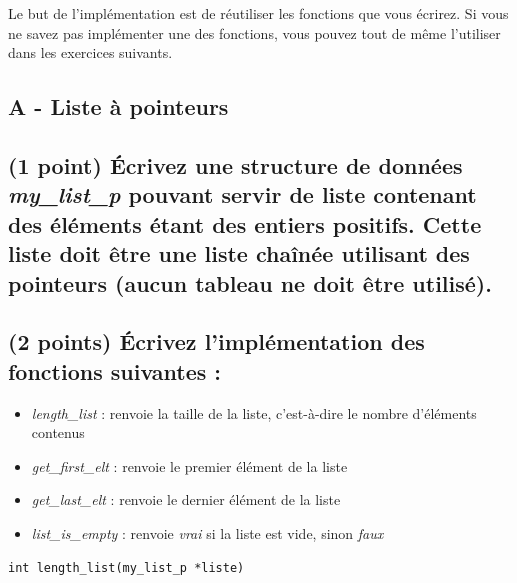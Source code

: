 \documentclass[11pt,a4paper]{article}
\begin{document}
Le but de l'implémentation est de réutiliser les fonctions que vous écrirez.
Si vous ne savez pas implémenter une des fonctions, vous pouvez tout de même l'utiliser dans les exercices suivants.

\vfillFirst

\subsection*{A - Liste à pointeurs}

\subsection{(1 point) \'Ecrivez une structure de données \og \textit{my\_list\_p} \fg{} pouvant servir de liste contenant des éléments étant des entiers positifs. Cette liste doit être une liste chaînée utilisant des pointeurs (aucun tableau ne doit être utilisé). }

\bigskip

\begin{center}
\end{center}

\bigskip

\subsection{(2 points) \'Ecrivez l'implémentation des fonctions suivantes : }

\begin{itemize}
\item \textit{length\_list} : renvoie la taille de la liste, c'est-à-dire le nombre d'éléments contenus
\item \textit{get\_first\_elt} : renvoie le premier élément de la liste
\item \textit{get\_last\_elt} : renvoie le dernier élément de la liste
\item \textit{list\_is\_empty} : renvoie \textit{vrai} si la liste est vide, sinon \textit{faux}
\end{itemize}

\bigskip

\texttt{int length\_list(my\_list\_p *liste)}

\begin{center}
\end{center}


\vfillLast
\end{document}
